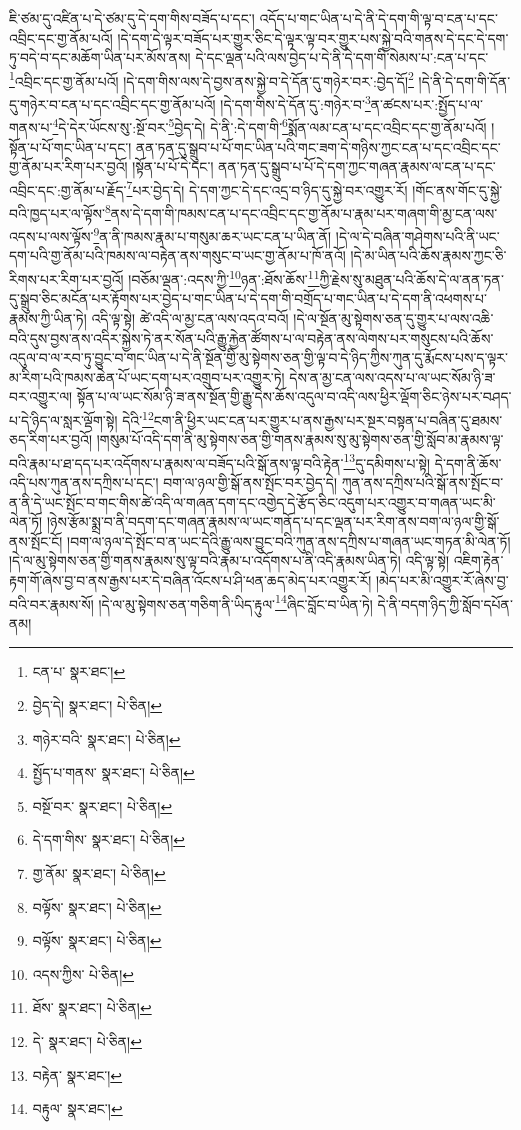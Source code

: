 ཇི་ཙམ་དུ་འཛིན་པ་དེ་ཙམ་དུ་དེ་དག་གིས་བཟོད་པ་དང་། འདོད་པ་གང་ཡིན་པ་དེ་ནི་དེ་དག་གི་ལྟ་བ་ངན་པ་དང་འབྲིང་དང་གྱ་ནོམ་པའོ། །དེ་དག་དེ་ལྟར་བཟོད་པར་གྱུར་ཅིང་དེ་ལྟར་ལྟ་བར་གྱུར་པས་སྐྱེ་བའི་གནས་དེ་དང་དེ་དག་ཏུ་བདེ་བ་དང་མཆོག་ཡིན་པར་མོས་ནས། དེ་དང་ལྡན་པའི་ལས་བྱེད་པ་དེ་ནི་དེ་དག་གི་སེམས་པ་:ངན་པ་དང་\footnote{ངན་པ་  སྣར་ཐང་། }འབྲིང་དང་གྱ་ནོམ་པའོ། །དེ་དག་གིས་ལས་དེ་བྱས་ནས་སྐྱེ་བ་དེ་དོན་དུ་གཉེར་བར་:བྱེད་དོ།\footnote{བྱེད་དེ།  སྣར་ཐང་།  པེ་ཅིན། } །དེ་ནི་དེ་དག་གི་དོན་དུ་གཉེར་བ་ངན་པ་དང་འབྲིང་དང་གྱ་ནོམ་པའོ། །དེ་དག་གིས་དེ་དོན་དུ་:གཉེར་བ་\footnote{གཉེར་བའི་  སྣར་ཐང་།  པེ་ཅིན། }ན་ཚངས་པར་:སྤྱོད་པ་ལ་གནས་པ་\footnote{སྤྱོད་པ་གནས་  སྣར་ཐང་།  པེ་ཅིན། }དེ་དེར་ཡོངས་སུ་:སྔོ་བར་\footnote{བསྔོ་བར་  སྣར་ཐང་།  པེ་ཅིན། }བྱེད་དེ། དེ་ནི་:དེ་དག་གི་\footnote{དེ་དག་གིས་  སྣར་ཐང་།  པེ་ཅིན། }སྨོན་ལམ་ངན་པ་དང་འབྲིང་དང་གྱ་ནོམ་པའོ། །སྟོན་པ་པོ་གང་ཡིན་པ་དང་། ནན་ཏན་དུ་སྒྲུབ་པ་པོ་གང་ཡིན་པའི་གང་ཟག་དེ་གཉིས་ཀྱང་ངན་པ་དང་འབྲིང་དང་གྱ་ནོམ་པར་རིག་པར་བྱའོ། །སྟོན་པ་པོ་དེ་དང་། ནན་ཏན་དུ་སྒྲུབ་པ་པོ་དེ་དག་ཀྱང་གཞན་རྣམས་ལ་ངན་པ་དང་འབྲིང་དང་:གྱ་ནོམ་པ་རྗོད་\footnote{གྱ་ནོམ་  སྣར་ཐང་།  པེ་ཅིན། }པར་བྱེད་དེ། དེ་དག་ཀྱང་དེ་དང་འདྲ་བ་ཉིད་དུ་སྐྱེ་བར་འགྱུར་རོ། །གོང་ནས་གོང་དུ་སྐྱེ་བའི་ཁྱད་པར་ལ་ལྟོས་\footnote{བལྟོས་  སྣར་ཐང་།  པེ་ཅིན། }ནས་དེ་དག་གི་ཁམས་ངན་པ་དང་འབྲིང་དང་གྱ་ནོམ་པ་རྣམ་པར་གཞག་གི་མྱ་ངན་ལས་འདས་པ་ལས་ལྟོས་\footnote{བལྟོས་  སྣར་ཐང་།  པེ་ཅིན། }ན་ནི་ཁམས་རྣམ་པ་གསུམ་ཆར་ཡང་ངན་པ་ཡིན་ནོ། །དེ་ལ་དེ་བཞིན་གཤེགས་པའི་ནི་ཡང་དག་པའི་གྱ་ནོམ་པའི་ཁམས་ལ་བརྟེན་ནས་གསུང་བ་ཡང་གྱ་ནོམ་པ་ཁོ་ནའོ། །དེ་མ་ཡིན་པའི་ཆོས་རྣམས་ཀྱང་ཅི་རིགས་པར་རིག་པར་བྱའོ། །བཅོམ་ལྡན་:འདས་ཀྱི་\footnote{འདས་ཀྱིས་  པེ་ཅིན། }ཉན་:ཐོས་ཆོས་\footnote{ཐོས་  སྣར་ཐང་།  པེ་ཅིན། }ཀྱི་རྗེས་སུ་མཐུན་པའི་ཆོས་དེ་ལ་ནན་ཏན་དུ་སྒྲུབ་ཅིང་མངོན་པར་རྟོགས་པར་བྱེད་པ་གང་ཡིན་པ་དེ་དག་གི་བགྲོད་པ་གང་ཡིན་པ་དེ་དག་ནི་འཕགས་པ་རྣམས་ཀྱི་ཡིན་ཏེ། འདི་ལྟ་སྟེ། ཚེ་འདི་ལ་མྱ་ངན་ལས་འདའ་བའོ། །དེ་ལ་སྔོན་མུ་སྟེགས་ཅན་དུ་གྱུར་པ་ལས་འཆི་བའི་དུས་བྱས་ནས་འདིར་སྐྱེས་ཏེ་ནར་སོན་པའི་རྒྱུ་རྐྱེན་ཚོགས་པ་ལ་བརྟེན་ནས་ལེགས་པར་གསུངས་པའི་ཆོས་འདུལ་བ་ལ་རབ་ཏུ་བྱུང་བ་གང་ཡིན་པ་དེ་ནི་སྔོན་གྱི་མུ་སྟེགས་ཅན་གྱི་ལྟ་བ་དེ་ཉིད་ཀྱིས་ཀུན་དུ་རྨོངས་པས་ད་ལྟར་མ་རིག་པའི་ཁམས་ཆེན་པོ་ཡང་དག་པར་འགྲུབ་པར་འགྱུར་ཏེ། དེས་ན་མྱ་ངན་ལས་འདས་པ་ལ་ཡང་སོམ་ཉི་ཟ་བར་འགྱུར་ལ། སྟོན་པ་ལ་ཡང་སོམ་ཉི་ཟ་ནས་སྔོན་གྱི་རྒྱུ་དེས་ཆོས་འདུལ་བ་འདི་ལས་ཕྱིར་ལྡོག་ཅིང་ཉེས་པར་བཤད་པ་དེ་ཉིད་ལ་སླར་ལྡོག་སྟེ། དེའི་\footnote{དེ་  སྣར་ཐང་།  པེ་ཅིན། }ངག་ནི་ཕྱིར་ཡང་ངན་པར་གྱུར་པ་ནས་རྒྱས་པར་སྔར་བསྟན་པ་བཞིན་དུ་ཐམས་ཅད་རིག་པར་བྱའོ། །གསུམ་པོ་འདི་དག་ནི་མུ་སྟེགས་ཅན་གྱི་གནས་རྣམས་སུ་མུ་སྟེགས་ཅན་གྱི་སློབ་མ་རྣམས་ལྟ་བའི་རྣམ་པ་ཐ་དད་པར་འདོགས་པ་རྣམས་ལ་བཟོད་པའི་སྒོ་ནས་ལྟ་བའི་རྟེན་\footnote{བརྟེན་  སྣར་ཐང་། }དུ་དམིགས་པ་སྟེ། དེ་དག་ནི་ཆོས་འདི་པས་ཀུན་ནས་དཀྲིས་པ་དང་། བག་ལ་ཉལ་གྱི་སྒོ་ནས་སྤོང་བར་བྱེད་དེ། ཀུན་ནས་དཀྲིས་པའི་སྒོ་ནས་སྤོང་བ་ན་ནི་དེ་ཡང་སྤོང་བ་གང་གིས་ཚེ་འདི་ལ་གཞན་དག་དང་འགྱེད་དེ་རྩོད་ཅིང་འདུག་པར་འགྱུར་བ་གཞན་ཡང་མི་ལེན་ཏོ། །ཉེས་རྩོམ་སྨྲ་བ་ནི་བདག་དང་གཞན་རྣམས་ལ་ཡང་གནོད་པ་དང་ལྡན་པར་རིག་ནས་བག་ལ་ཉལ་གྱི་སྒོ་ནས་སྤོང་ངོ། །བག་ལ་ཉལ་དེ་སྤོང་བ་ན་ཡང་དེའི་རྒྱུ་ལས་བྱུང་བའི་ཀུན་ནས་དཀྲིས་པ་གཞན་ཡང་གཏན་མི་ལེན་ཏོ། །དེ་ལ་མུ་སྟེགས་ཅན་གྱི་གནས་རྣམས་སུ་ལྟ་བའི་རྣམ་པ་འདོགས་པ་ནི་འདི་རྣམས་ཡིན་ཏེ། འདི་ལྟ་སྟེ། འཇིག་རྟེན་རྟག་གོ་ཞེས་བྱ་བ་ནས་རྒྱས་པར་དེ་བཞིན་འོངས་པ་ཤི་ཕན་ཆད་མེད་པར་འགྱུར་རོ། །མེད་པར་མི་འགྱུར་རོ་ཞེས་བྱ་བའི་བར་རྣམས་སོ། །དེ་ལ་མུ་སྟེགས་ཅན་གཅིག་ནི་ཡིད་རྟུལ་\footnote{བརྟུལ་  སྣར་ཐང་། }ཞིང་བློང་བ་ཡིན་ཏེ། དེ་ནི་བདག་ཉིད་ཀྱི་སློབ་དཔོན་ནམ། 